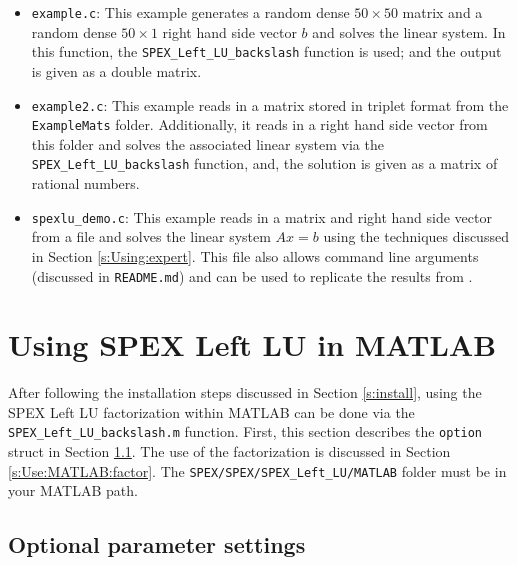 \documentclass[12pt]{report}
\theoremstyle{definition}
\begin{document}
\begin{itemize}
\item \verb|example.c|: This example generates a random dense $50 \times 50$
matrix and a random dense $50 \times 1$ right hand side vector $b$ and
solves the linear system. In this function, the \verb|SPEX_Left_LU_backslash|
function is used; and the output is given as a double matrix.

\item \verb|example2.c|: This example reads in a matrix stored in triplet
format from the \verb|ExampleMats| folder. Additionally, it reads in a
right hand side vector from this folder and solves the associated linear system
via the \verb|SPEX_Left_LU_backslash| function, and, the solution is given as a matrix
of rational numbers.

\item \verb|spexlu_demo.c|: This example reads in a matrix and right hand side
vector from a file and solves the linear system $A x = b$
using the techniques discussed in Section \ref{s:Using:expert}. This file also
allows command line arguments (discussed in \verb|README.md|) and can be used
to replicate the results from \cite{lourenco2019exact}.

\end{itemize}

\cprotect\section{Using SPEX Left LU in MATLAB}
\label{s:Use:MATLAB}

After following the installation steps discussed in Section \ref{s:install},
using the SPEX Left LU factorization within MATLAB can be done via the
\verb|SPEX_Left_LU_backslash.m| function. First, this section describes the
\verb|option| struct in Section \ref{s:Use:MATLAB:setup}.
The use of the factorization is discussed in Section \ref{s:Use:MATLAB:factor}.
The \verb|SPEX/SPEX/SPEX_Left_LU/MATLAB| folder must be in your MATLAB path.

\cprotect\subsection{Optional parameter settings}
\label{s:Use:MATLAB:setup}
\end{document}
